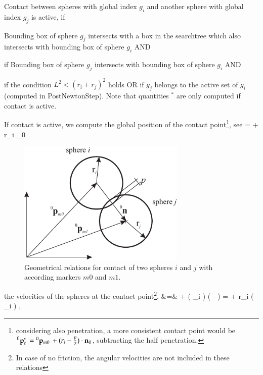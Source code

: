 %
%
\noindent Contact between spheres with global index $g_i$ and another sphere with global index $g_j$ is active, if
\bi
  \item Bounding box of sphere $g_j$ intersects with a box in the searchtree which also intersects with bounding box of sphere $g_i$ AND
  \item if Bounding box of sphere $g_j$ intersects with bounding box of sphere $g_i$ AND
  \item if the condition $L^2 < \left(r_i + r_j\right)^2$ holds OR
  if $g_j$ belongs to the active set of $g_i$ (computed in PostNewtonStep).
\ei
Note that quantities $^*$ are only computed if contact is active.

\noindent If contact is active, we compute the global position of the contact point\footnote{considering also penetration, a more consistent contact point would be $\prescript{0}{}{\mathbf{p}_{c}^*}\, = \prescript{0}{}{\mathbf{p}_{m0}}\, + (r_i - \frac{p}{2}) \cdot \mathbf{n}_0$, subtracting the half penetration.}, see 
\be
   =  + r_i \cdot \nv_0 \eqComma
\ee
\begin{figure}[tbp]
  \begin{center}
  \includegraphics[width=8cm]{figures/generalContactSpheres}
  \end{center}
  \caption{Geometrical relations for contact of two spheres $i$ and $j$ with according markers $m0$ and $m1$.}
  \label{fig_GeneralContactSpheres}
\end{figure}
the velocities of the spheres at the contact point\footnote{In case of no friction, the angular velocities are not included in these relations},
\bea
   &=&  + \left(  _{i} \right) \times 
               \left(  -  \right)
              =  + r_i \cdot \left(  _{i} \right) \times {},\nonumber \\
